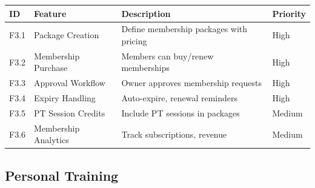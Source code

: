 \documentclass[
  12pt,
  a4paperpaper,
]{report}
\newcounter{none} %
\begin{document}
{\def\LTcaptype{none} %
\begin{longtable}[]{@{}
  >{\raggedright\arraybackslash}p{}
  >{\raggedright\arraybackslash}p{}
  >{\raggedright\arraybackslash}p{}
  >{\raggedright\arraybackslash}p{}@{}}
\hline
\begin{minipage}[b]{\linewidth}\raggedright
ID
\end{minipage} & \begin{minipage}[b]{\linewidth}\raggedright
Feature
\end{minipage} & \begin{minipage}[b]{\linewidth}\raggedright
Description
\end{minipage} & \begin{minipage}[b]{\linewidth}\raggedright
Priority
\end{minipage} \\
\hline
\endhead
\hline
\endlastfoot
F3.1 & Package Creation & Define membership packages with pricing &
High \\
F3.2 & Membership Purchase & Members can buy/renew memberships & High \\
F3.3 & Approval Workflow & Owner approves membership requests & High \\
F3.4 & Expiry Handling & Auto-expire, renewal reminders & High \\
F3.5 & PT Session Credits & Include PT sessions in packages & Medium \\
F3.6 & Membership Analytics & Track subscriptions, revenue & Medium \\
\end{longtable}
}

\subsection{Personal Training}\label{personal-training}
\end{document}
